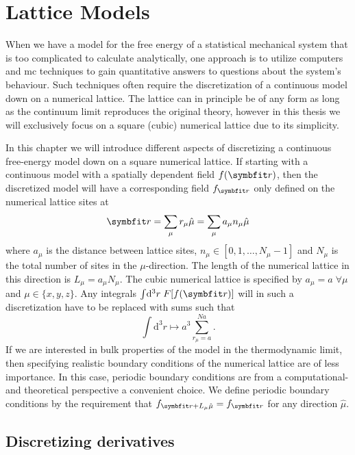 \chapter{Lattice Models}
\label{sec:LM}
%
\noindent When we have a model for the free energy of a statistical mechanical system that is too complicated to
calculate analytically, one approach is to utilize computers and \ac{mc} techniques to gain quantitative answers to
questions about the system's behaviour. 
Such techniques often require the discretization of a continuous model down on a numerical lattice.
The lattice can in principle be of any form as long as the continuum limit reproduces
the original theory, however in this thesis we will exclusively focus on a square (cubic) numerical lattice
due to its simplicity.

In this chapter we will introduce different aspects of discretizing a continuous free-energy model down
on a square numerical lattice. If starting with a continuous model with a spatially dependent field
$f(\v{r})$, then the discretized model will have a corresponding field $f_\v{r}$ only defined on the
numerical lattice sites at
\begin{equation}
    \label{eq:LM:latticeSites}
    \v{r} = \sum_\mu r_\mu\hat{\mu} = \sum_\mu a_\mu n_\mu\hat{\mu}
\end{equation}
where $a_\mu$ is the distance between lattice sites, $n_\mu\in[0,1,\ldots,N_\mu-1]$ and $N_\mu$ is the total number of sites in the $\mu$-direction.
The length of the numerical lattice in this direction is $L_\mu = a_\mu N_\mu$. The cubic numerical lattice
is specified by $a_\mu = a\;\forall\mu$ and $\mu\in\{x,y,z\}$.
Any integrals $\int\!\mathrm{d}^3r\;F[f(\v{r})]$ will
in such a discretization have to be replaced with sums such that
\begin{equation}
    \label{eq:LM:integrals}
    \int\!\mathrm{d}^3r \mapsto a^3\sum_{r_\mu=a}^{Na}.
\end{equation}
If we are interested in bulk properties of the model in the thermodynamic limit, then specifying realistic
boundary conditions of the numerical lattice are of less importance. In this case, periodic boundary conditions
are from a computational- and theoretical perspective a convenient choice. We define periodic boundary conditions by the requirement that
$f_{\v{r}+L_\mu\hat{\mu}} = f_\v{r}$ for any direction $\hat{\mu}$.

\section{Discretizing derivatives}

